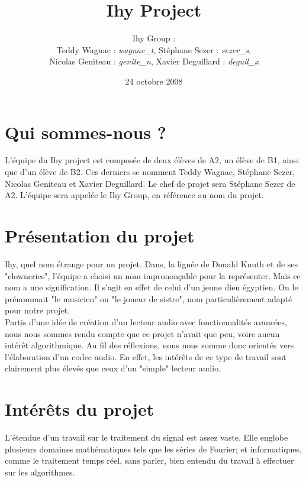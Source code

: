 \documentclass[a4paper,12pt]{article}
\title{Ihy Project}
\author{
Ihy Group : \\
Teddy Wagnac : \textit{wagnac\_t}, Stéphane Sezer : \textit{sezer\_s},\\
Nicolas Geniteau : \textit{genite\_n}, Xavier Deguillard : \textit{deguil\_x}
}
\date{24 octobre 2008}
\begin{document}
\maketitle

\section*{Qui sommes-nous ?}
L'équipe du Ihy project est composée de deux élèves de A2, un élève de B1, ainsi
que d'un élève de B2.  Ces derniers se nomment	Teddy  Wagnac,	Stéphane  Sezer,
Nicolas Geniteau et Xavier Deguillard. Le chef de projet sera Stéphane Sezer de
A2.  L'équipe sera appelée	le	Ihy  Group,  en  référence	au	nom  du  projet.

\section*{Présentation du projet}
Ihy, quel nom étrange pour un projet. Dans, la lignée de Donald Knuth et de ses
"clowneries", l'équipe a choisi un nom imprononçable pour la représenter.	Mais
ce nom a une signification.  Il  s'agit  en  effet	de	celui  d'un  jeune	dieu
égyptien.  On le  prénommait  "le  musicien"  ou  "le  joueur  de  sistre",  nom
particulièrement adapté pour notre projet.\\ Partis d'une idée de création	d'un
lecteur audio avec fonctionnalités avancées, nous nous sommes rendu  compte  que
ce projet n'avait que peu,	voire  aucun  intérêt  algorithmique.	Au	fil  des
réflexions, nous nous somme donc orientés vers l'élaboration d'un  codec  audio.
En effet, les intérêts de ce type de travail sont  clairement  plus  élevés  que
ceux d'un "simple" lecteur audio.

\section*{Intérêts du projet}
L'étendue d'un travail sur le traitement du signal est assez vaste. Elle englobe
plusieurs  domaines  mathématiques	tels  que  les	 séries   de   Fourier;   et
informatiques, comme le traitement temps réel,	sans  parler,  bien  entendu  du
travail à effectuer sur les algorithmes.
\end{document}

